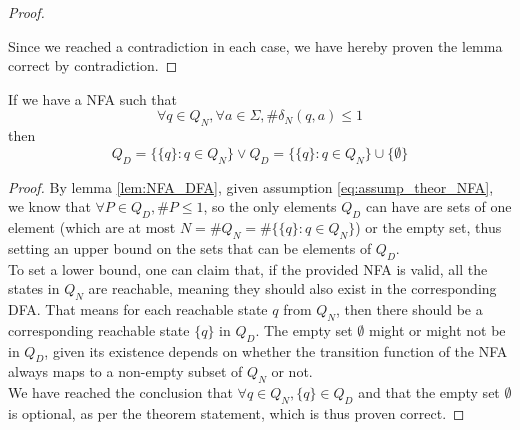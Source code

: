 \documentclass[docid=TP03]{tcom_TP}
\begin{document}
{\begin{proof}
\begin{enumerate}
	\end{enumerate}
	Since we reached a contradiction in each case, we have hereby proven the lemma correct by contradiction. 
\end{proof}
\begin{theorem}
	If we have a NFA such that
	\begin{equation} \label{eq:assump_theor_NFA}
		\forall q \in Q_N, \forall a \in \Sigma, \#\delta_N(q,a)\leq 1
	\end{equation}
	then
	\begin{equation}
		Q_D=\{\{q\}:q\in Q_N\} \vee Q_D=\{\{q\}:q\in Q_N\} \cup \{\emptyset\}
	\end{equation}
\end{theorem}
\begin{proof}
	By lemma \ref{lem:NFA_DFA}, given assumption \eqref{eq:assump_theor_NFA}, we know that $\forall P \in Q_D, \#P \leq 1$, so the only elements $Q_D$ can have are sets of one element (which are at most $N = \#Q_N=\#\{\{q\}:q\in Q_N\}$) or the empty set, thus setting an upper bound on the sets that can be elements of $Q_D$.\\
	To set a lower bound, one can claim that, if the provided NFA is valid, all the states in $Q_N$ are reachable, meaning they should also exist in the corresponding DFA. That means for each reachable state $q$ from $Q_N$, then there should be a corresponding reachable state $\{q\}$ in $Q_D$. The empty set $\emptyset$ might or might not be in $Q_D$, given its existence depends on whether the transition function of the NFA always maps to a non-empty subset of $Q_N$ or not.\\
	We have reached the conclusion that $\forall q \in Q_N, \{q\} \in Q_D$ and that the empty set $\emptyset$ is optional, as per the theorem statement, which is thus proven correct.
\end{proof}
}
\end{document}
